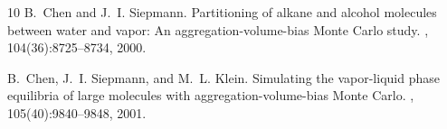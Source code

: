 \documentclass[11pt,a4paper]{article}
\begin{document}

\begin{thebibliography}{10}
B.~Chen and J.~I. Siepmann.
\newblock Partitioning of alkane and alcohol molecules between water and vapor: An aggregation-volume-bias Monte Carlo study.
, 104(36):8725--8734, 2000.

B.~Chen, J.~I. Siepmann, and M.~L. Klein.
\newblock Simulating the vapor-liquid phase equilibria of large molecules with aggregation-volume-bias Monte Carlo.
, 105(40):9840--9848, 2001.

\end{thebibliography}
\end{document}
